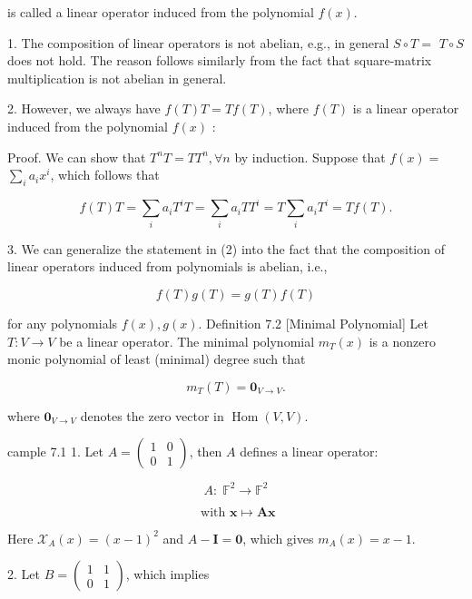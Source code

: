 \documentclass[11pt]{article}
\begin{document}
is called a linear operator induced from the polynomial \(f\left( x\right)\).

1. The composition of linear operators is not abelian, e.g., in general \(S \circ  T =\)  \(T \circ  S\) does not hold. The reason follows similarly from the fact that square-matrix multiplication is not abelian in general.

2. However, we always have \(f\left( T\right) T = {Tf}\left( T\right)\), where \(f\left( T\right)\) is a linear operator induced from the polynomial \(f\left( x\right)\) :

Proof. We can show that \({T}^nT = T{T}^n,\forall n\) by induction. Suppose that \(f\left( x\right)  =\)  \(\mathop{\sum }\limits_{i}{a}_{i}{x}^{i}\), which follows that

\[
f\left( T\right) T = \mathop{\sum }\limits_{i}{a}_{i}{T}^{i}T = \mathop{\sum }\limits_{i}{a}_{i}T{T}^{i} = T\mathop{\sum }\limits_{i}{a}_{i}{T}^{i} = {Tf}\left( T\right) .
\]

3. We can generalize the statement in (2) into the fact that the composition of linear operators induced from polynomials is abelian, i.e.,

\[
f\left( T\right) g\left( T\right)  = g\left( T\right) f\left( T\right)
\]

for any polynomials \(f\left( x\right) ,g\left( x\right)\). Definition 7.2 [Minimal Polynomial] Let \(T : V \rightarrow  V\) be a linear operator. The minimal polynomial \({m}_{T}\left( x\right)\) is a nonzero monic polynomial of least (minimal) degree such that

\[
{m}_{T}\left( T\right)  = {\mathbf{0}}_{V \rightarrow  V}.
\]

where \({\mathbf{0}}_{V \rightarrow  V}\) denotes the zero vector in \(\operatorname{Hom}\left( {V,V}\right)\).

cample 7.1 1. Let \(A = \left( \begin{array}{ll} 1 & 0 \\  0 & 1 \end{array}\right)\), then \(A\) defines a linear operator:

\[
A : \;{\mathbb{F}}^2 \rightarrow  {\mathbb{F}}^2
\]

\[
\text{ with }\mathbf{x} \mapsto  \mathbf{{Ax}}
\]

Here \({\mathcal{X}}_{A}\left( x\right)  = {\left( x - 1\right) }^2\) and \(A - \mathbf{I} = \mathbf{0}\), which gives \({m}_{A}\left( x\right)  = x - 1\).

2. Let \(B = \left( \begin{array}{ll} 1 & 1 \\  0 & 1 \end{array}\right)\), which implies
\end{document}
